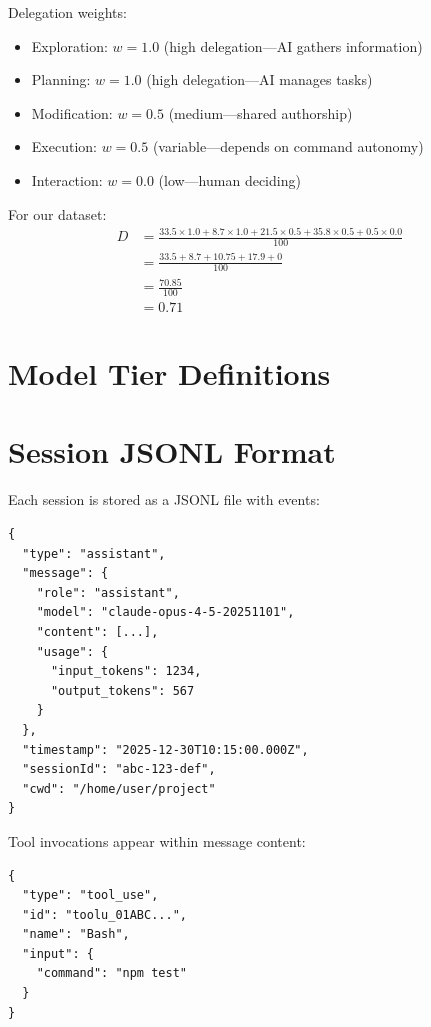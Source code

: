 Delegation weights:
\begin{itemize}
    \item Exploration: $w = 1.0$ (high delegation---AI gathers information)
    \item Planning: $w = 1.0$ (high delegation---AI manages tasks)
    \item Modification: $w = 0.5$ (medium---shared authorship)
    \item Execution: $w = 0.5$ (variable---depends on command autonomy)
    \item Interaction: $w = 0.0$ (low---human deciding)
\end{itemize}

For our dataset:
\begin{align}
D &= \frac{33.5 \times 1.0 + 8.7 \times 1.0 + 21.5 \times 0.5 + 35.8 \times 0.5 + 0.5 \times 0.0}{100} \\
&= \frac{33.5 + 8.7 + 10.75 + 17.9 + 0}{100} \\
&= \frac{70.85}{100} \\
&= 0.71
\end{align}

\section{Model Tier Definitions}

\begin{table}[h]
\caption{Claude Model Tiers}
\end{table}

\section{Session JSONL Format}

Each session is stored as a JSONL file with events:

\begin{lstlisting}[caption={Sample JSONL event}]
{
  "type": "assistant",
  "message": {
    "role": "assistant",
    "model": "claude-opus-4-5-20251101",
    "content": [...],
    "usage": {
      "input_tokens": 1234,
      "output_tokens": 567
    }
  },
  "timestamp": "2025-12-30T10:15:00.000Z",
  "sessionId": "abc-123-def",
  "cwd": "/home/user/project"
}
\end{lstlisting}

Tool invocations appear within message content:

\begin{lstlisting}[caption={Tool use structure}]
{
  "type": "tool_use",
  "id": "toolu_01ABC...",
  "name": "Bash",
  "input": {
    "command": "npm test"
  }
}
\end{lstlisting}
